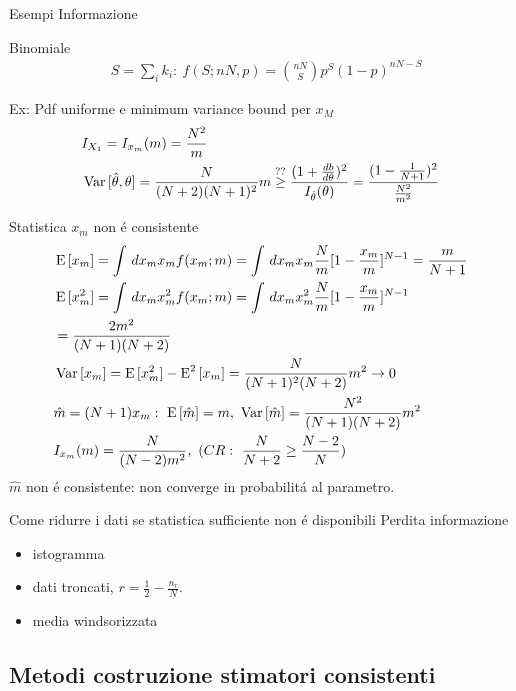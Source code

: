 \begin{wordonframe}{Esempi Informazione}
\begin{block}{Binomiale}
\begin{align*}
&S=\sum_ik_i:\ f(S;nN,p)=\binom{nN}{S}p^S(1-p)^{nN-S}
\end{align*}
\end{block}
\begin{block}{Ex: Pdf uniforme e minimum variance bound per $x_M$}
\begin{align*}
&I_{X_1}=I_{x_m}(m)=\frac{N^2}{m}\\
&\operatorname{Var}{[\hat{\theta},\theta]}=\frac{N}{(N+2)(N+1)^2}m\overset{??}{\geq}\frac{(1+\frac{d b}{d \theta})^2}{I_{\hat{\theta}}(\theta)}=\frac{(1-\frac{1}{N+1})^2}{\frac{N^2}{m^2}}
\end{align*}
\end{block}
\framebreak
\begin{block}{Statistica $x_m$ non \'e consistente}
\begin{align*}
&\E{[x_m]}=\int\,dx_mx_mf(x_m;m)=\int\,dx_mx_m\frac{N}{m}[1-\frac{x_m}{m}]^{N-1}=\frac{m}{N+1}\\
&\E{[x_m^2]}=\int\,dx_mx_m^2f(x_m;m)=\int\,dx_mx_m^2\frac{N}{m}[1-\frac{x_m}{m}]^{N-1}\\
&=\frac{2m^2}{(N+1)(N+2)}\\
&\var{[x_m]}=\E{[x_m^2]}-\E^2{[x_m]}=\frac{N}{(N+1)^2(N+2)}m^2\to0\\
&\hat{m}=(N+1)x_m:\ \E{[\hat{m}]}=m,\ \var{[\hat{m}]}=\frac{N^2}{(N+1)(N+2)}m^2\\
&I_{x_m}(m)=\frac{N}{(N-2)m^2},\ (CR:\ \frac{N}{N+2}\geq\frac{N-2}{N})
\end{align*}
$\hat{m}$ non \'e consistente: non converge in probabilit\'a al parametro.
\end{block}
\end{wordonframe}

\begin{frame}{Come ridurre i dati se statistica sufficiente non \'e disponibili}
Perdita informazione
\begin{itemize}
\item istogramma
\item dati troncati, $r=\frac{1}{2}-\frac{n_r}{N}$.
\item media windsorizzata
\end{itemize}
\end{frame}

\subsection{Metodi costruzione stimatori consistenti}

